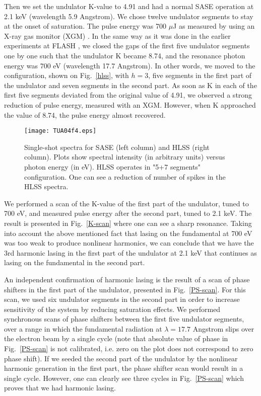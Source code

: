 \documentclass[aps,prl,preprint,groupedaddress,preprintnumbers]{revtex4}
\begin{document}
Then we set the undulator K-value to 4.91 and had a normal SASE operation at 2.1 keV
(wavelength 5.9 Angstrom). We chose twelve undulator
segments to stay at the onset of saturation. The pulse energy was 700 $\mu$J as measured by using an X-ray gas monitor
(XGM) \cite{xgm-1,xgm-2}. In the same way as it was done in the earlier experiments at FLASH \cite{prab-hlss-fl2},
we closed the 
gaps of the first five undulator segments one by one such that the undulator K became 8.74, and the resonance photon
energy was 700 eV (wavelength 17.7 Angstrom). In other words, we moved to the configuration, shown
on Fig.~\ref{hlss}, with $h=3$, five segments in the first part of the undulator and seven segments in
the second part.
As soon as K in each of the first five segments deviated from the original value of 4.91, we observed a strong reduction
of pulse energy, measured with an XGM. However, when K approached the value of 8.74, the pulse energy almost
recovered.

\begin{figure}[tb]
\texttt{[image: TUA04f4.eps]}

\caption{\small Single-shot spectra for SASE (left column) and HLSS (right column).
Plots show spectral intensity (in arbitrary units) versus photon energy (in eV).
HLSS operates in "5+7 segments" configuration. One can see a reduction of number of spikes in the HLSS spectra.
}
\label{spikes}
\end{figure}


We performed a scan of the K-value of the first part of the undulator, tuned to 700 eV, and measured pulse energy
after the second part, tuned to 2.1 keV. The result is presented in
Fig.~\ref{K-scan} where one can see a sharp resonance. Taking into account the above mentioned
fact that lasing on the fundamental at 700 eV was too weak to produce nonlinear harmonics, we can conclude that
we have the 3rd harmonic lasing in the first part of the undulator at 2.1 keV that continues as lasing
on the fundamental in the second part.


An independent confirmation of harmonic lasing is the result of a scan
of phase shifters in the first part of the undulator, presented in Fig.~\ref{PS-scan}.
For this scan, we used six undulator segments in the second part in order to increase sensitivity of the
system by reducing saturation effects. We performed synchronous scans of phase shifters between the first five
undulator segments, over a range in which the fundamental radiation at $\lambda = 17.7$ Angstrom slips
over the electron beam by a single cycle (note that absolute value of phase in Fig.~\ref{PS-scan} is not calibrated, i.e. zero on the plot does not correspond to zero phase shift). If we seeded the second part of the undulator by the nonlinear
harmonic generation in the first part, the phase shifter scan would result in a single cycle. However, one
can clearly see three cycles in Fig.~\ref{PS-scan} which proves that we had harmonic lasing.
\end{document}
